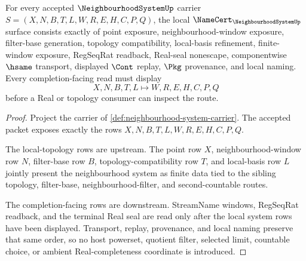 \begin{theorem}
\label{thm:neighbourhood-system-namecert-obligations}
For every accepted $\NeighbourhoodSystemUp$ carrier $S=(X,N,B,T,L,W,R,E,H,C,P,Q)$, the local $\NameCert_{\NeighbourhoodSystemUp}$ surface consists exactly of point exposure, neighbourhood-window exposure, filter-base generation, topology compatibility, local-basis refinement, finite-window exposure, RegSeqRat readback, Real-seal nonescape, componentwise $\hsame$ transport, displayed $\Cont$ replay, $\Pkg$ provenance, and local naming. Every completion-facing read must display
$$
X,N,B,T,L \longmapsto W,R,E,H,C,P,Q
$$
before a Real or topology consumer can inspect the route.
\end{theorem}
\begin{proof}
Project the carrier of \autoref{def:neighbourhood-system-carrier}. The accepted packet exposes exactly the rows $X,N,B,T,L,W,R,E,H,C,P,Q$.

The local-topology rows are upstream. The point row $X$, neighbourhood-window row $N$, filter-base row $B$, topology-compatibility row $T$, and local-basis row $L$ jointly present the neighbourhood system as finite data tied to the sibling topology, filter-base, neighbourhood-filter, and second-countable routes.

The completion-facing rows are downstream. StreamName windows, RegSeqRat readback, and the terminal Real seal are read only after the local system rows have been displayed. Transport, replay, provenance, and local naming preserve that same order, so no host powerset, quotient filter, selected limit, countable choice, or ambient Real-completeness coordinate is introduced.
\end{proof}


